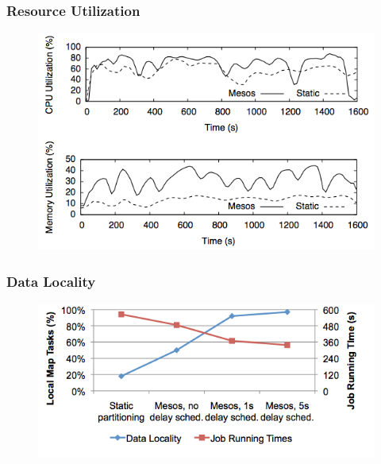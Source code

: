 \begin{frame}
\frametitle{Resource Utilization}
\begin{figure}[h]
  \centering
  \includegraphics[scale=0.6]{./figures/mesos_perf_ru}
  \label{fig:mesos_perf_ru}
\end{figure}
\end{frame}

\begin{frame}
\frametitle{Data Locality}
\begin{figure}[h]
  \centering
  \includegraphics[scale=0.6]{./figures/mesos_perf_dl}
  \label{fig:mesos_perf_dl}
\end{figure}
\end{frame}
